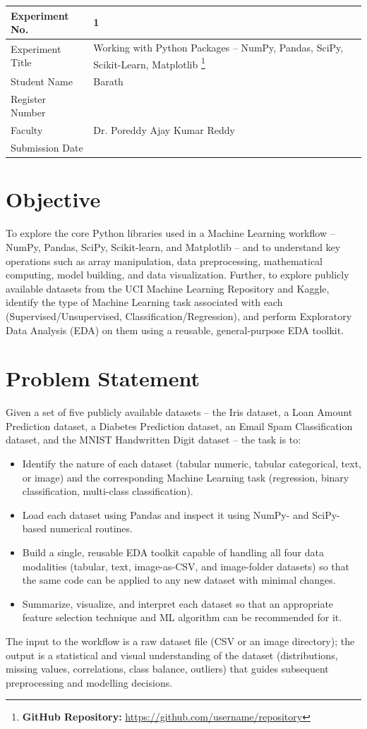 \documentclass[12pt,a4paper]{article}
\begin{document}
\begin{tabular}{|p{4cm}|p{11cm}|}
\hline
Experiment No. & 1 \\ \hline
Experiment Title & Working with Python Packages -- NumPy, Pandas, SciPy, Scikit-Learn, Matplotlib
\footnote{\textbf{GitHub Repository: }\url{https://github.com/username/repository}}\\ \hline
Student Name & Barath \\ \hline
Register Number & \\ \hline
Faculty & Dr. Poreddy Ajay Kumar Reddy \\ \hline
Submission Date & \\ \hline
\end{tabular}

\section{Objective}
To explore the core Python libraries used in a Machine Learning workflow -- NumPy, Pandas,
SciPy, Scikit-learn, and Matplotlib -- and to understand key operations such as array
manipulation, data preprocessing, mathematical computing, model building, and data
visualization. Further, to explore publicly available datasets from the UCI Machine Learning
Repository and Kaggle, identify the type of Machine Learning task associated with each
(Supervised/Unsupervised, Classification/Regression), and perform Exploratory Data Analysis
(EDA) on them using a reusable, general-purpose EDA toolkit.

\section{Problem Statement}
Given a set of five publicly available datasets -- the Iris dataset, a Loan Amount Prediction
dataset, a Diabetes Prediction dataset, an Email Spam Classification dataset, and the MNIST
Handwritten Digit dataset -- the task is to:
\begin{itemize}
\item Identify the nature of each dataset (tabular numeric, tabular categorical, text, or
image) and the corresponding Machine Learning task (regression, binary classification,
multi-class classification).
\item Load each dataset using Pandas and inspect it using NumPy- and SciPy-based numerical
routines.
\item Build a single, reusable EDA toolkit capable of handling all four data modalities
(tabular, text, image-as-CSV, and image-folder datasets) so that the same code can be applied
to any new dataset with minimal changes.
\item Summarize, visualize, and interpret each dataset so that an appropriate feature
selection technique and ML algorithm can be recommended for it.
\end{itemize}
The input to the workflow is a raw dataset file (CSV or an image directory); the output is a
statistical and visual understanding of the dataset (distributions, missing values,
correlations, class balance, outliers) that guides subsequent preprocessing and modelling
decisions.
\end{document}
